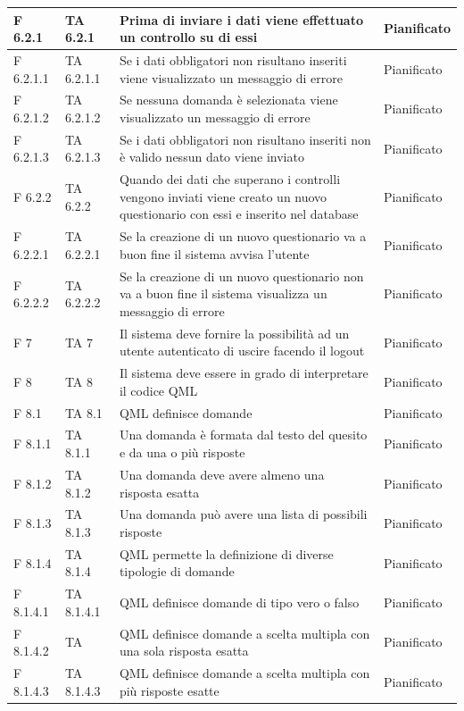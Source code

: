 \documentclass[a4paper,11pt]{article}
\begin{document}
\begin{longtable}{p{}p{}p{}p{}}
\midrule
F 6.2.1 & TA 6.2.1 &Prima di inviare i dati viene effettuato un controllo su di essi & Pianificato\\
\midrule
F 6.2.1.1 & TA 6.2.1.1 &Se i dati obbligatori non risultano inseriti viene visualizzato un messaggio di errore & Pianificato\\
\midrule
F 6.2.1.2 &TA 6.2.1.2 &Se nessuna domanda è selezionata viene visualizzato un messaggio di errore & Pianificato\\
\midrule
F 6.2.1.3 & TA 6.2.1.3 &Se i dati obbligatori non risultano inseriti non è valido nessun dato viene inviato & Pianificato\\
\midrule
F 6.2.2 &TA 6.2.2 &Quando dei dati che superano i controlli vengono inviati viene creato un nuovo questionario con essi e inserito nel database & Pianificato\\
\midrule
F 6.2.2.1 &TA 6.2.2.1 &Se la creazione di un nuovo questionario va a buon fine il sistema avvisa l'utente & Pianificato\\
\midrule
F 6.2.2.2 & TA 6.2.2.2 &Se la creazione di un nuovo questionario non va a buon fine il sistema visualizza un messaggio di errore & Pianificato\\
\midrule
F 7 & TA 7&Il sistema deve fornire la possibilità ad un utente autenticato di uscire facendo il logout & Pianificato\\
\midrule
F 8 & TA 8&Il sistema deve essere in grado di interpretare il codice QML & Pianificato\\
\midrule
F 8.1 & TA 8.1&QML definisce domande & Pianificato\\
\midrule
F 8.1.1 &TA 8.1.1&Una domanda è formata dal testo del quesito e da una o più risposte & Pianificato\\
\midrule
F 8.1.2 &TA 8.1.2&Una domanda deve avere almeno una risposta esatta & Pianificato\\
\midrule
F 8.1.3 & TA 8.1.3&Una domanda può avere una lista di possibili risposte & Pianificato\\
\midrule
F 8.1.4 & TA 8.1.4 &QML permette la definizione di diverse tipologie di domande & Pianificato\\
\midrule
F 8.1.4.1 &TA 8.1.4.1 &QML definisce domande di tipo vero o falso & Pianificato\\
\midrule
F 8.1.4.2 & TA&QML definisce domande a scelta multipla con una sola risposta esatta & Pianificato\\
\midrule
F 8.1.4.3 & TA 8.1.4.3 &QML definisce domande a scelta multipla con più risposte esatte & Pianificato\\

\end{longtable}
\end{document}
